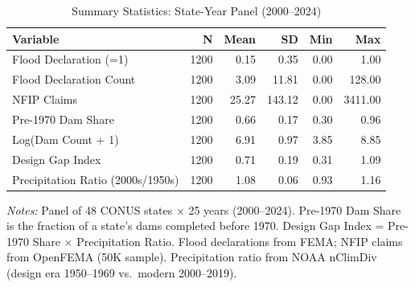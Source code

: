 \begin{table}[htbp]
\centering
\caption{Summary Statistics: State-Year Panel (2000--2024)}
\label{tab:summary}
\begin{threeparttable}
\begin{tabular}{lrrrrr}
\toprule
Variable & N & Mean & SD & Min & Max \\
\midrule
Flood Declaration (=1)            & 1200 & 0.15   & 0.35   & 0.00 & 1.00   \\
Flood Declaration Count           & 1200 & 3.09   & 11.81  & 0.00 & 128.00 \\
NFIP Claims                       & 1200 & 25.27  & 143.12 & 0.00 & 3411.00 \\
Pre-1970 Dam Share                & 1200 & 0.66   & 0.17   & 0.30 & 0.96   \\
Log(Dam Count + 1)                & 1200 & 6.91   & 0.97   & 3.85 & 8.85   \\
Design Gap Index                  & 1200 & 0.71   & 0.19   & 0.31 & 1.09   \\
Precipitation Ratio (2000s/1950s) & 1200 & 1.08   & 0.06   & 0.93 & 1.16   \\
\bottomrule
\end{tabular}
\begin{tablenotes}[flushleft]
\small
\item \textit{Notes:} Panel of 48 CONUS states $\times$ 25 years (2000--2024). Pre-1970 Dam Share is the fraction of a state's dams completed before 1970. Design Gap Index = Pre-1970 Share $\times$ Precipitation Ratio. Flood declarations from FEMA; NFIP claims from OpenFEMA (50K sample). Precipitation ratio from NOAA nClimDiv (design era 1950--1969 vs.\ modern 2000--2019).
\end{tablenotes}
\end{threeparttable}
\end{table}
